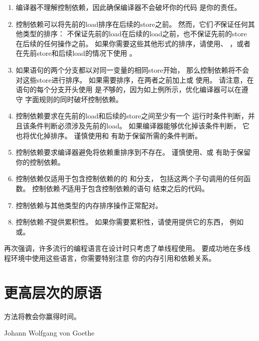 \begin{enumerate}
\item	编译器不理解控制依赖，因此确保编译器不会破坏你的代码
	是你的责任。

\item	控制依赖可以将先前的load排序在后续的store之前。
	然而，它们\emph{不}保证任何其他类型的排序：
	不保证先前的load在后续的load之前，也不保证先前的store
	在后续的任何操作之前。
	如果你需要这些其他形式的排序，请使用、
	，或者在先前store和后续load的情况下使用
	。

\item	如果语句的两个分支都以对同一变量的相同store开始，
	那么控制依赖将不会对这些store进行排序。
	如果需要排序，在两者之前加上或
	使用。
	请注意，在语句的每个分支开头使用
	是\emph{不}够的，因为如上例所示，优化编译器可以在遵守
	字面规则的同时破坏控制依赖。

\item	控制依赖要求在先前的load和后续的store之间至少有一个
	运行时条件判断，并且该条件判断必须涉及先前的load。
	如果编译器能够优化掉该条件判断，
	它也将优化掉排序。
	谨慎使用和
	有助于保留所需的条件判断。

\item	控制依赖要求编译器避免将依赖重排序到不存在。
	谨慎使用、或
	有助于保留你的控制依赖。

\item	控制依赖仅适用于包含控制依赖的的
	和分支，
	包括这两个子句调用的任何函数。
	控制依赖\emph{不}适用于包含控制依赖的语句
	结束之后的代码。

\item	控制依赖与其他类型的内存排序操作正常配对。

\item	控制依赖\emph{不}提供累积性。
	如果你需要累积性，请使用提供它的东西，
	例如或。
\end{enumerate}

再次强调，许多流行的编程语言在设计时只考虑了单线程使用。
要成功地在多线程环境中使用这些语言，你需要特别注意
你的内存引用和依赖关系。

\section{更高层次的原语}
\label{sec:memorder:Higher-Level Primitives}
%
\epigraph{方法将教会你赢得时间。}
	 {Johann Wolfgang von Goethe}

